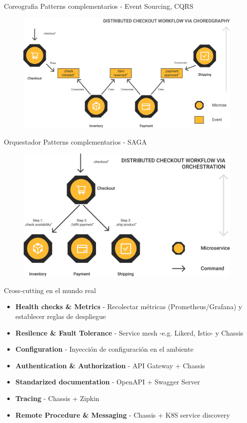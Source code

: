 \documentclass[aspectratio=169]{beamer}
\begin{document}
\begin{frame}{Coreografia}
Patterns complementarios - Event Sourcing, CQRS
\begin{figure}
	\centering
	\includegraphics[width=0.7\linewidth]{Images/mpcore}
\end{figure}
\end{frame}

\begin{frame}{Orquestador}
Patterns complementarios - SAGA
\begin{figure}
	\centering
	\includegraphics[width=0.7\linewidth]{Images/mporch}
\end{figure}

\end{frame}

\begin{frame}{Cross-cutting en el mundo real}

\begin{itemize}
	\item \textbf{Health checks \& Metrics} - Recolectar métricas  (Prometheus/Grafana) y establecer reglas de despliegue
	\item \textbf{Resilence \& Fault Tolerance} - Service mesh -e.g. Likerd, Istio- y Chassis
	\item \textbf{Configuration} - Inyección de configuración en el ambiente
	\item \textbf{Authentication \& Authorization} - API Gateway + Chassis
	\item \textbf{Standarized documentation} - OpenAPI + Swagger Server
    \item \textbf{Tracing} - Chassis + Zipkin
    \item\textbf{ Remote Procedure \& Messaging} - Chassis + K8S service discovery
\end{itemize}

\end{frame}
\end{document}
